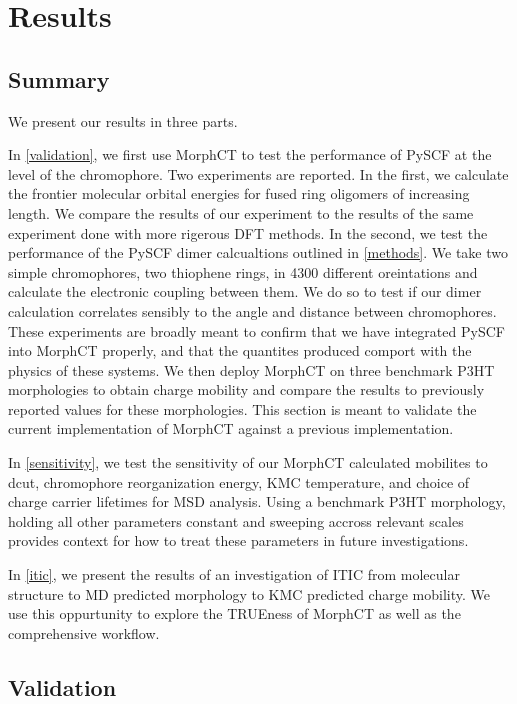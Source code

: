 \chapter{Results}
\label{results}

\section{Summary}

We present our results in three parts. 

In \autoref{validation}, we first use MorphCT to test the performance of PySCF at the level of the chromophore.
Two experiments are reported. In the first, we calculate the frontier molecular orbital
energies for fused ring oligomers of increasing length. We compare the results of our experiment to the
results of the same experiment done with more rigerous DFT methods. In the second, we test the 
performance of the PySCF dimer calcualtions outlined in \autoref{methods}. 
We take two simple chromophores, two thiophene rings, in 4300 different oreintations and calculate the
electronic coupling between them. We do so to test if our dimer calculation correlates sensibly to the angle
and distance between chromophores. These experiments are broadly meant to confirm that we have integrated
PySCF into MorphCT properly, and that the quantites produced comport with the physics of these systems.
We then deploy MorphCT on three benchmark P3HT morphologies to obtain charge mobility
and compare the results to previously reported values for these morphologies. This section is meant to
validate the current implementation of MorphCT against a previous implementation. 

In \autoref{sensitivity}, we test the sensitivity of our MorphCT calculated mobilites to dcut, chromophore
reorganization energy, KMC temperature, and choice of charge carrier lifetimes for MSD analysis. Using a
benchmark P3HT morphology, holding all other parameters constant and sweeping accross relevant scales
provides context for how to treat these parameters in future investigations. 

In \autoref{itic}, we present the results of an investigation of ITIC from molecular structure to MD predicted
morphology to KMC predicted charge mobility. We use this oppurtunity to explore the TRUEness of MorphCT as
well as the comprehensive workflow.  


\section{Validation}

